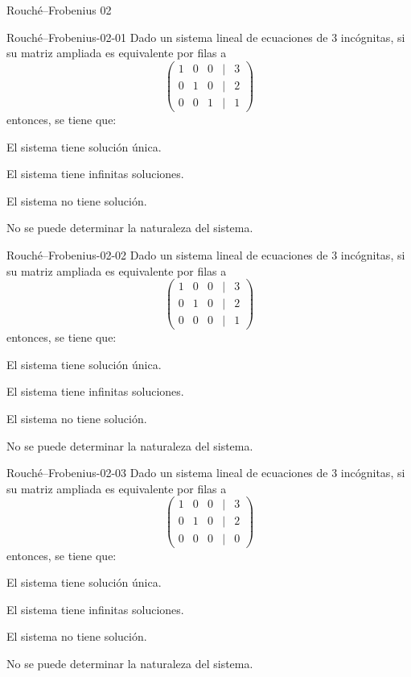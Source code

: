 \documentclass[a4,11pt]{aleph-notas}
\begin{document}
\begin{quiz}{Rouché–Frobenius 02}

\begin{multi}[]%
    {Rouché–Frobenius-02-01}
    Dado un sistema lineal de ecuaciones de 3 incógnitas, si su matriz ampliada es equivalente por filas a 
    \[
    \begin{pmatrix}
    1 & 0 & 0 & | & 3 \\
    0 & 1 & 0 & | & 2 \\
    0 & 0 & 1 & | & 1
    \end{pmatrix}
    \]
    entonces, se tiene que:
    \item* El sistema tiene solución única.
    \item El sistema tiene infinitas soluciones.
    \item El sistema no tiene solución.
    \item No se puede determinar la naturaleza del sistema.
\end{multi}

\begin{multi}[]%
    {Rouché–Frobenius-02-02}
    Dado un sistema lineal de ecuaciones de 3 incógnitas, si su matriz ampliada es equivalente por filas a 
    \[
    \begin{pmatrix}
    1 & 0 & 0 & | & 3 \\
    0 & 1 & 0 & | & 2 \\
    0 & 0 & 0 & | & 1
    \end{pmatrix}
    \]
    entonces, se tiene que:
    \item El sistema tiene solución única.
    \item El sistema tiene infinitas soluciones.
    \item* El sistema no tiene solución.
    \item No se puede determinar la naturaleza del sistema.
\end{multi}

\begin{multi}[]%
    {Rouché–Frobenius-02-03}
    Dado un sistema lineal de ecuaciones de 3 incógnitas, si su matriz ampliada es equivalente por filas a 
    \[
    \begin{pmatrix}
    1 & 0 & 0 & | & 3 \\
    0 & 1 & 0 & | & 2 \\
    0 & 0 & 0 & | & 0
    \end{pmatrix}
    \]
    entonces, se tiene que:
    \item El sistema tiene solución única.
    \item* El sistema tiene infinitas soluciones.
    \item El sistema no tiene solución.
    \item No se puede determinar la naturaleza del sistema.
\end{multi}


\end{quiz}
\end{document}
